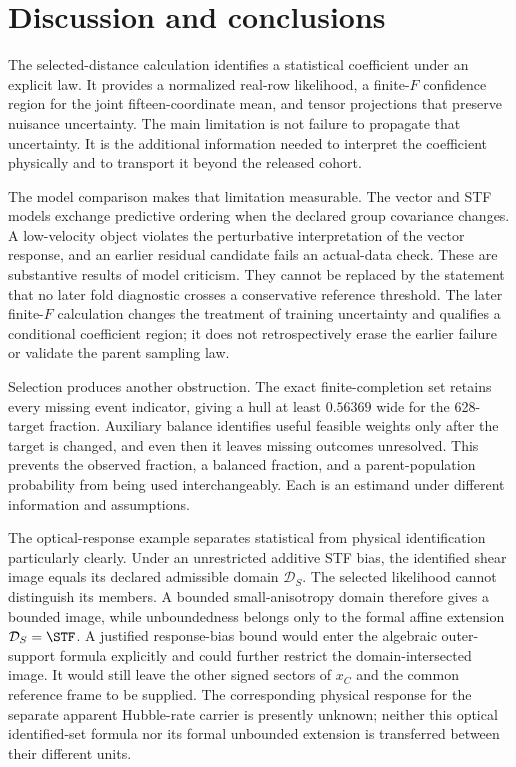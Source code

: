 \section{Discussion and conclusions}
\label{sec:discussion}

The selected-distance calculation identifies a statistical coefficient under an explicit law. It provides a normalized real-row likelihood, a finite-$F$ confidence region for the joint fifteen-coordinate mean, and tensor projections that preserve nuisance uncertainty. The main limitation is not failure to propagate that uncertainty. It is the additional information needed to interpret the coefficient physically and to transport it beyond the released cohort.

The model comparison makes that limitation measurable. The vector and STF models exchange predictive ordering when the declared group covariance changes. A low-velocity object violates the perturbative interpretation of the vector response, and an earlier residual candidate fails an actual-data check. These are substantive results of model criticism. They cannot be replaced by the statement that no later fold diagnostic crosses a conservative reference threshold. The later finite-$F$ calculation changes the treatment of training uncertainty and qualifies a conditional coefficient region; it does not retrospectively erase the earlier failure or validate the parent sampling law.

Selection produces another obstruction. The exact finite-completion set retains every missing event indicator, giving a hull at least $0.56369$ wide for the 628-target fraction. Auxiliary balance identifies useful feasible weights only after the target is changed, and even then it leaves missing outcomes unresolved. This prevents the observed fraction, a balanced fraction, and a parent-population probability from being used interchangeably. Each is an estimand under different information and assumptions.

The optical-response example separates statistical from physical identification particularly clearly. Under an unrestricted additive STF bias, the identified shear image equals its declared admissible domain $\mathcal D_S$. The selected likelihood cannot distinguish its members. A bounded small-anisotropy domain therefore gives a bounded image, while unboundedness belongs only to the formal affine extension $\mathcal D_S=\STF$. A justified response-bias bound would enter the algebraic outer-support formula explicitly and could further restrict the domain-intersected image. It would still leave the other signed sectors of $x_C$ and the common reference frame to be supplied. The corresponding physical response for the separate apparent Hubble-rate carrier is presently unknown; neither this optical identified-set formula nor its formal unbounded extension is transferred between their different units.

